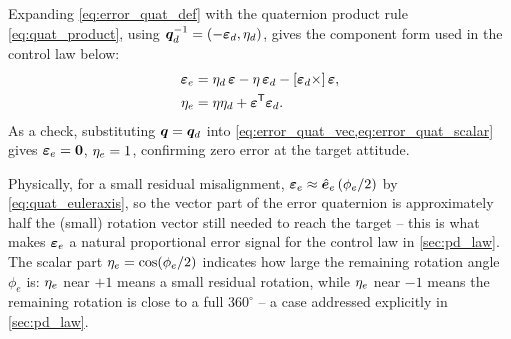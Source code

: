 Expanding \cref{eq:error_quat_def} with the quaternion product rule \cref{eq:quat_product}, using $\bm{q}_d^{-1}=(-\bm{\varepsilon}_d,\eta_d)$, gives the component form used in the control law below:
\begin{align}
    \bm{\varepsilon}_e &= \eta_d\,\bm{\varepsilon} - \eta\,\bm{\varepsilon}_d - [\bm{\varepsilon}_d\times]\,\bm{\varepsilon}, \label{eq:error_quat_vec}\\
    \eta_e &= \eta\eta_d + \bm{\varepsilon}^{\mathsf{T}}\bm{\varepsilon}_d. \label{eq:error_quat_scalar}
\end{align}
As a check, substituting $\bm{q}=\bm{q}_d$ into \cref{eq:error_quat_vec,eq:error_quat_scalar} gives $\bm{\varepsilon}_e=\bm{0}$, $\eta_e=1$, confirming zero error at the target attitude.

Physically, for a small residual misalignment, $\bm{\varepsilon}_e \approx \hat{\bm{e}}_e\,(\phi_e/2)$ by \cref{eq:quat_euleraxis}, so the vector part of the error quaternion is approximately half the (small) rotation vector still needed to reach the target -- this is what makes $\bm{\varepsilon}_e$ a natural proportional error signal for the control law in \cref{sec:pd_law}. The scalar part $\eta_e = \cos(\phi_e/2)$ indicates how large the remaining rotation angle $\phi_e$ is: $\eta_e$ near $+1$ means a small residual rotation, while $\eta_e$ near $-1$ means the remaining rotation is close to a full $360^\circ$ -- a case addressed explicitly in \cref{sec:pd_law}.

